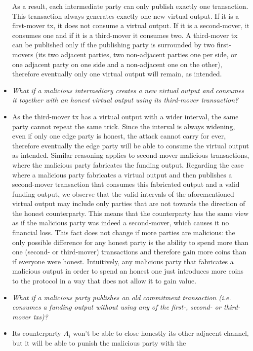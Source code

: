 \begin{itemize}
  As a result, each intermediate party can only publish exactly one transaction.
  This transaction always generates exactly one new virtual output. If it is a
  first-mover tx, it does not consume a virtual output. If it is a second-mover,
  it consumes one and if it is a third-mover it consumes two. A third-mover tx
  can be published only if the publishing party is surrounded by two
  first-movers (its two adjacent parties, two non-adjacent parties one per side,
  or one adjacent party on one side and a non-adjacent one on the other),
  therefore eventually only one virtual output will remain, as intended.
  \item \emph{What if a malicious intermediary creates a new virtual output and
  consumes it together with an honest virtual output using its third-mover
  transaction?}
  \item As the third-mover tx has a virtual output with a wider interval, the
  same party cannot repeat the same trick. Since the interval is always
  widening, even if only one edge party is honest, the attack cannot carry for
  ever, therefore eventually the edge party will be able to consume the virtual
  output as intended. Similar reasoning applies to second-mover malicious
  transactions, where the malicious party fabricates the funding output.
  Regarding the case where a malicious party fabricates a virtual output and
  then publishes a second-mover transaction that consumes this fabricated output
  and a valid funding output, we observe that the valid intervals of the
  aforementioned virtual output may include only parties that are not towards
  the direction of the honest counterparty. This means that the counterparty
  has the same view as if the malicious party was indeed a second-mover, which
  causes it no financial loss. This fact does not change if more parties
  are malicious: the only possible difference for any honest party is the
  ability to spend more than one (second- or third-mover) transactions and
  therefore gain more coins than if everyone were honest. Intuitively, any
  malicious party that fabricates a malicious output in order to spend an honest
  one just introduces more coins to the protocol in a way that does not allow it
  to gain value.
  \item \emph{What if a malicious party publishes an old commitment transaction
  (i.e. consumes a funding output without using any of the first-, second- or
  third-mover txs)?}
  \item Its counterparty $A_i$ won't be able to close honestly its other
  adjacent channel, but it will be able to punish the malicious party with the

\end{itemize}
